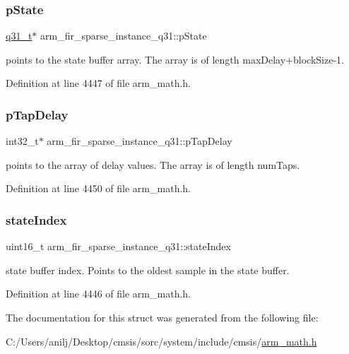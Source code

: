 \subsubsection{\texorpdfstring{p\+State}{pState}}
{\footnotesize\ttfamily \hyperlink{arm__math_8h_adc89a3547f5324b7b3b95adec3806bc0}{q31\+\_\+t}$\ast$ arm\+\_\+fir\+\_\+sparse\+\_\+instance\+\_\+q31\+::p\+State}

points to the state buffer array. The array is of length max\+Delay+block\+Size-\/1. 

Definition at line 4447 of file arm\+\_\+math.\+h.

\mbox{\label{structarm__fir__sparse__instance__q31_ab87ae457adec8f727afefaa2599fc983}} 
\subsubsection{\texorpdfstring{p\+Tap\+Delay}{pTapDelay}}
{\footnotesize\ttfamily int32\+\_\+t$\ast$ arm\+\_\+fir\+\_\+sparse\+\_\+instance\+\_\+q31\+::p\+Tap\+Delay}

points to the array of delay values. The array is of length num\+Taps. 

Definition at line 4450 of file arm\+\_\+math.\+h.

\mbox{\label{structarm__fir__sparse__instance__q31_a557ed9d477e76e4ad2019344f19f568a}} 
\subsubsection{\texorpdfstring{state\+Index}{stateIndex}}
{\footnotesize\ttfamily uint16\+\_\+t arm\+\_\+fir\+\_\+sparse\+\_\+instance\+\_\+q31\+::state\+Index}

state buffer index. Points to the oldest sample in the state buffer. 

Definition at line 4446 of file arm\+\_\+math.\+h.



The documentation for this struct was generated from the following file\+:\begin{DoxyCompactItemize}
\item 
C\+:/\+Users/anilj/\+Desktop/cmsis/sorc/system/include/cmsis/\hyperlink{arm__math_8h}{arm\+\_\+math.\+h}\end{DoxyCompactItemize}

